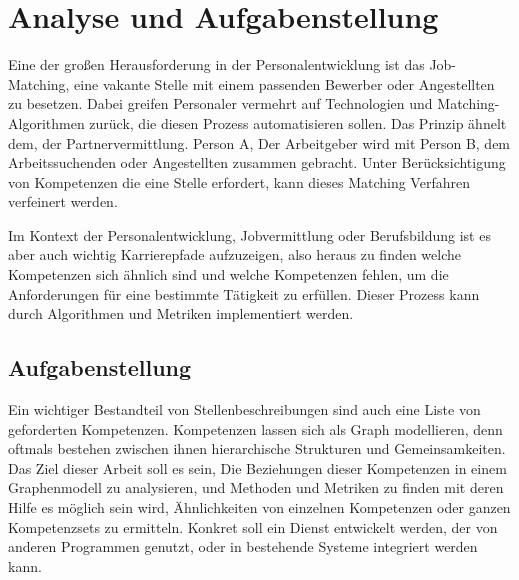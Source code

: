 \section{Analyse und Aufgabenstellung}\label{analysis}

%
%

Eine der großen Herausforderung in der Personalentwicklung ist das Job-Matching, eine vakante Stelle mit einem passenden Bewerber oder Angestellten zu besetzen. Dabei greifen Personaler vermehrt auf Technologien und Matching-Algorithmen zurück, die diesen Prozess automatisieren sollen. Das Prinzip ähnelt dem, der Partnervermittlung. Person A, Der Arbeitgeber wird mit Person B, dem Arbeitssuchenden oder Angestellten zusammen gebracht. Unter Berücksichtigung von Kompetenzen die eine Stelle erfordert, kann dieses Matching Verfahren verfeinert werden.

Im Kontext der Personalentwicklung, Jobvermittlung oder Berufsbildung ist es aber auch wichtig Karrierepfade aufzuzeigen, also heraus zu finden welche Kompetenzen sich ähnlich sind und welche Kompetenzen fehlen, um die Anforderungen für eine bestimmte Tätigkeit zu erfüllen. Dieser Prozess kann durch Algorithmen und Metriken implementiert werden.


\vspace{1em}

\subsection{Aufgabenstellung}

Ein wichtiger Bestandteil von Stellenbeschreibungen sind auch eine Liste von geforderten Kompetenzen. Kompetenzen lassen sich als Graph modellieren, denn oftmals bestehen zwischen ihnen hierarchische Strukturen und Gemeinsamkeiten. Das Ziel dieser Arbeit soll es sein, Die Beziehungen dieser Kompetenzen in einem Graphenmodell zu analysieren, und Methoden und Metriken zu finden mit deren Hilfe es möglich sein wird, Ähnlichkeiten von einzelnen Kompetenzen oder ganzen Kompetenzsets zu ermitteln. Konkret soll ein Dienst entwickelt werden, der von anderen Programmen genutzt, oder in bestehende Systeme integriert werden kann.

